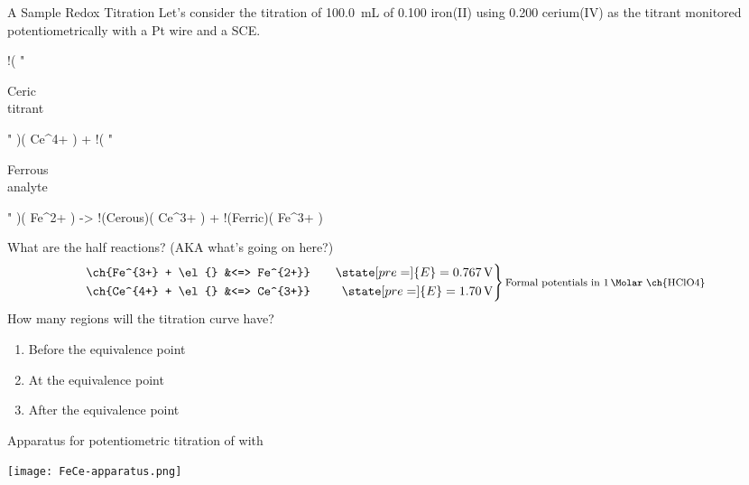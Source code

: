 \documentclass[notes=only]{beamer}
\begin{document}
\begin{frame}{A Sample Redox Titration}
	Let's consider the titration of \SI{100.0}{\milli\liter} of
	\SI{0.100}{\Molar} iron(II) using \SI{0.200}{\Molar} cerium(IV) as the
	titrant monitored potentiometrically with a Pt wire and a SCE.
	\begin{reaction*}
		!( "\parbox{\widthof{~titrant~}}{\centering Ceric\\ titrant}" )( Ce^{4+} ) +
		!( "\parbox{\widthof{~analyte~}}{\centering Ferrous\\ analyte}" )( Fe^{2+} ) ->
		!(Cerous)( Ce^{3+} ) + !(Ferric)( Fe^{3+} )
	\end{reaction*}
	\pause
	What are the half reactions? (AKA what's going on here?)
	\pause
	\begin{equation*}
		\left.\begin{aligned}
		\ch{Fe^{3+} + \el{} &<=> Fe^{2+}} &&\quad
		\state[pre=]{E} =
		\SI{0.767}{\volt} \\
		\ch{Ce^{4+} + \el{} &<=> Ce^{3+}} &&\quad
		\state[pre=]{E} =
		\SI{1.70}{\volt}
		\end{aligned}\right\}
		\text{\footnotesize Formal potentials in \SI{1}{\Molar}
	\ch{HClO4}}
	\end{equation*}
	\pause
	How many regions will the titration curve have?
	\pause
	\begin{enumerate}
		\item Before the equivalence point
		\item At the equivalence point
		\item After the equivalence point
	\end{enumerate}
\end{frame}

\begin{frame}{Apparatus for potentiometric titration of  with
	}
	\begin{center}
		\texttt{[image: FeCe-apparatus.png]}
	\end{center}
\end{frame}

\end{document}
